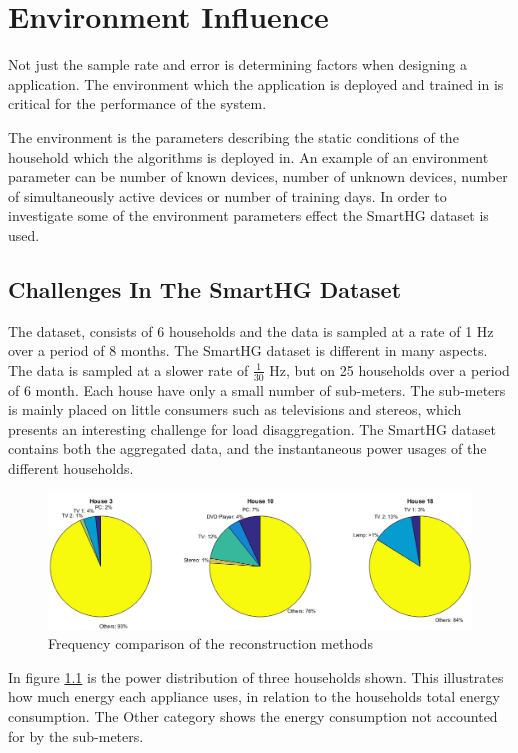 \chapter{Environment Influence } 
Not just the sample rate and error is determining factors when designing a  application. The environment which the application is deployed and trained in is critical for the performance of the system. 

The environment is the parameters describing the static conditions of the household which the algorithms is deployed in. An example of an environment parameter can be number of known devices, number of unknown devices, number of simultaneously active devices or number of training days. In order to investigate some of the environment parameters effect the SmartHG dataset is used. 

\section{Challenges In The SmartHG Dataset} 
The  dataset, consists of 6 households and the data is sampled at a rate of 1 Hz over a period of 8 months. The SmartHG dataset is different in many aspects. The data is sampled at a slower rate of $\frac{1}{30}$ Hz, but on 25 households over a period of 6 month. Each house have only a small number of sub-meters. The sub-meters is mainly placed on little consumers such as televisions and stereos, which presents an interesting challenge for load disaggregation. The SmartHG dataset contains both the aggregated data, and the instantaneous power usages of the different households.

\begin{figure}[H]
\centering
\includegraphics[width=1\textwidth]{billeder/TotalPie.png}
\caption{Frequency comparison of the reconstruction methods}
\label{fig:SLC}
\end{figure}

In figure \ref{fig:SLC} is the power distribution of three households shown. This illustrates how much energy each appliance uses, in relation to the households total energy consumption. The Other category shows the energy consumption not accounted for by the sub-meters.  

